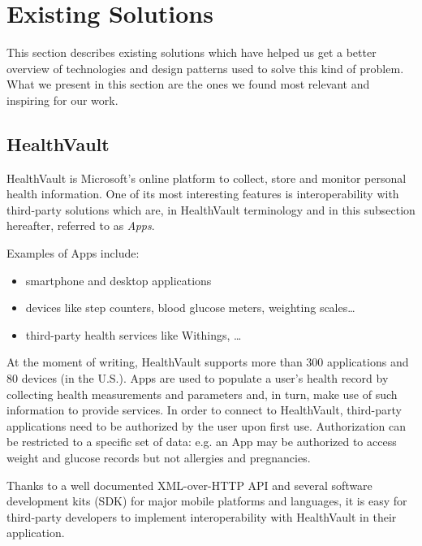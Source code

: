 \section{Existing Solutions}
\label{section:existing-solutions}

This section describes existing solutions which have helped us get a better overview of technologies
and design patterns used to solve this kind of problem. 
What we present in this section are the ones we found most relevant and inspiring for our work.

\subsection{HealthVault}

HealthVault\cite{HealthVault} is Microsoft's online platform to collect, store and monitor personal health information. 
One of its most interesting features is interoperability with third-party solutions which are,
in HealthVault terminology and in this subsection hereafter, referred to as \textit{Apps}.

Examples of Apps include:
\begin{itemize}
\item smartphone and desktop applications
\item devices like step counters, blood glucose meters, weighting scales\ldots
\item third-party health services like Withings, \ldots
\end{itemize}

At the moment of writing, HealthVault supports more than 300 applications and 80 devices (in the U.S.).
Apps are used to populate a user's health record by collecting health measurements and parameters and, in turn,
make use of such information to provide services.
In order to connect to HealthVault, third-party applications need to be authorized by the user upon first use. 
Authorization can be restricted to a specific set of data: e.g. an App may be authorized to access weight and
glucose records but not allergies and pregnancies.

Thanks to a well documented XML-over-HTTP API and several software development kits (SDK)
for major mobile platforms and languages, it is easy for third-party developers to implement
interoperability with HealthVault in their application.

